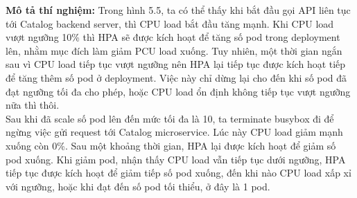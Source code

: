 \noindent \textbf{Mô tả thí nghiệm:} Trong hình 5.5, ta có thể thấy khi bắt đầu gọi API liên tục tới Catalog backend server, thì CPU load bắt đầu tăng mạnh. Khi CPU load vượt ngưỡng 10\% thì HPA sẽ được kích hoạt để tăng số pod trong deployment lên, nhằm mục đích làm giảm PCU load xuống. Tuy nhiên, một thời gian ngắn sau vì CPU load tiếp tục vượt ngưỡng nên HPA lại tiếp tục được kích hoạt tiếp để tăng thêm số pod ở deployment. Việc này chỉ dừng lại cho đến khi số pod đã đạt ngưỡng tối đa cho phép, hoặc CPU load ổn định không tiếp tục vượt ngưỡng nữa thì thôi.\\[0.5cm]
Sau khi đã scale số pod lên đến mức tối đa là 10, ta terminate busybox đi để ngừng việc gửi request tới Catalog microservice. Lúc này CPU load giảm mạnh xuống còn 0\%. Sau một khoảng thời gian, HPA lại được kích hoạt để giảm số pod xuống. Khi giảm pod, nhận thấy CPU load vẫn tiếp tục dưới ngưỡng, HPA tiếp tục được kích hoạt để giảm tiếp số pod xuống, đến khi nào CPU load xấp xỉ với ngưỡng, hoặc khi đạt đến số pod tối thiểu, ở đây là 1 pod.